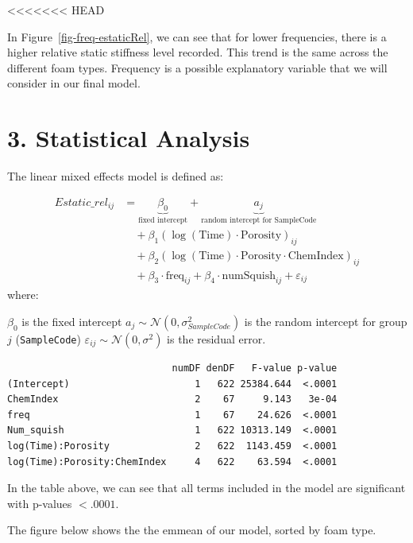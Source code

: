 \documentclass[
  letterpaper,
  DIV=11,
  numbers=noendperiod]{scrartcl}
\begin{document}
\textless\textless\textless\textless\textless\textless\textless{} HEAD

In Figure~\ref{fig-freq-estaticRel}, we can see that for lower
frequencies, there is a higher relative static stiffness level recorded.
This trend is the same across the different foam types. Frequency is a
possible explanatory variable that we will consider in our final model.

\section{3. Statistical Analysis}\label{statistical-analysis}

The linear mixed effects model is defined as:

\[
\begin{align*}
Estatic\_rel_{ij} &= \underbrace{\beta_0}_{\text{fixed intercept}} + \underbrace{a_j}_{\text{random intercept for SampleCode}} \\
&\quad + \beta_1 \left(\log(\text{Time}) \cdot \text{Porosity} \right)_{ij} \\
&\quad + \beta_2 \left(\log(\text{Time}) \cdot \text{Porosity} \cdot \text{ChemIndex} \right)_{ij} \\
&\quad + \beta_3 \cdot \text{freq}_{ij} + \beta_4 \cdot \text{numSquish}_{ij} + \varepsilon_{ij}
\end{align*}
\] where:

\(\beta_0\) is the fixed intercept
\(a_j \sim \mathcal{N}(0, \sigma^2_{SampleCode})\) is the random
intercept for group \(j\) (\texttt{SampleCode})
\(\varepsilon_{ij} \sim \mathcal{N}(0, \sigma^2)\) is the residual
error.

\begin{verbatim}
                             numDF denDF   F-value p-value
(Intercept)                      1   622 25384.644  <.0001
ChemIndex                        2    67     9.143   3e-04
freq                             1    67    24.626  <.0001
Num_squish                       1   622 10313.149  <.0001
log(Time):Porosity               2   622  1143.459  <.0001
log(Time):Porosity:ChemIndex     4   622    63.594  <.0001
\end{verbatim}

In the table above, we can see that all terms included in the model are
significant with p-values \(< .0001\).

The figure below shows the the emmean of our model, sorted by foam type.
\end{document}
